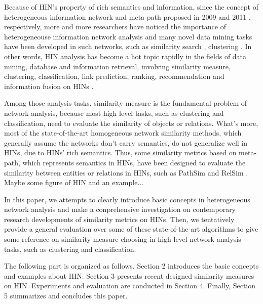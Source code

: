 \documentclass{acm_proc_article-csis8101}
\begin{document}
Because of HIN's property of rich semantics and information, since the concept of heterogeneous information network and meta path proposed in 2009 \cite{sun2009rankclus} and 2011 \cite{sun2011pathsim}, respectively, more and more researchers have noticed the importance of heterogeneouse information network analysis and many novel data mining tasks have been developed in such networks, such as similarity search \cite{shi2012relevance,sun2011pathsim}, clustering \cite{sun2013pathselclus}. In other words, HIN analysis has become a hot topic rapidly in the fields of data mining, database and information retrieval, involving similarity measure, clustering, classification, link prediction, ranking, recommendation and information fusion on HINs \cite{shi2017survey}.

Among those analysis tasks, similarity measure is the fundamental problem of network analysis, because most high level tasks, such as clustering and classification, need to evaluate the similarity of objects or relations. What's more, most of the state-of-the-art homogeneous network similarity methods, which generally assume the networks don't carry semantics, do not generalize well in HINs, due to HINs' rich semantics. Thus, some similarity metrics based on meta-path, which represents semantics in HINs, have been designed to evaluate the similarity between entities or relations in HINs, such as PathSim \cite{sun2011pathsim} and RelSim \cite{wang2016relsim}. {\color{red} Maybe some figure of HIN and an example...}

In this paper, we attempts to clearly introduce basic concepts in heterogeneous network analysis and make a conprehensive investigation on contemporary research developments of similarity metrics on HINs. Then, we tentatively provide a general evaluation over some of these state-of-the-art algorithms to give some reference on similarity measure choosing in high level network analysis tasks, such as clustering and classification.

The following part is organized as follows. Section 2 introduces the basic concepts and examples about HIN. Section 3 presents recent designed similarity measures on HIN. Experiments and evaluation are conducted in Section 4. Finally, Section 5 summarizes and concludes this paper.

\end{document}
